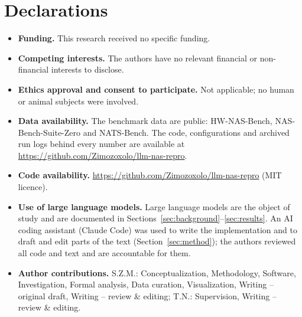 \documentclass[pdflatex,sn-mathphys-num]{sn-jnl}
\begin{document}
\backmatter

\section*{Declarations}
\begin{itemize}
\item \textbf{Funding.} This research received no specific funding.
\item \textbf{Competing interests.} The authors have no relevant financial or non-financial interests to disclose.
\item \textbf{Ethics approval and consent to participate.} Not applicable; no human or animal subjects were involved.
\item \textbf{Data availability.} The benchmark data are public: HW-NAS-Bench, NAS-Bench-Suite-Zero and NATS-Bench. The code, configurations and archived run logs behind every number are available at \url{https://github.com/Zimozoxolo/llm-nas-repro}.
\item \textbf{Code availability.} \url{https://github.com/Zimozoxolo/llm-nas-repro} (MIT licence).
\item \textbf{Use of large language models.} Large language models are the object of study and are documented in Sections~\ref{sec:background}--\ref{sec:results}. An AI coding assistant (Claude Code) was used to write the implementation and to draft and edit parts of the text (Section~\ref{sec:method}); the authors reviewed all code and text and are accountable for them.
\item \textbf{Author contributions.} S.Z.M.: Conceptualization, Methodology, Software, Investigation, Formal analysis, Data curation, Visualization, Writing -- original draft, Writing -- review \& editing; T.N.: Supervision, Writing -- review \& editing.
\end{itemize}
\end{document}
